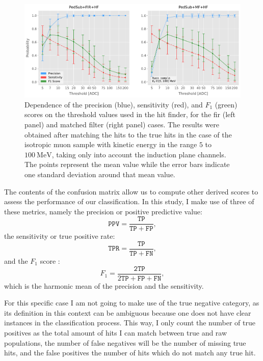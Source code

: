 \begin{figure}[t]
	\centering
	\includegraphics[width=.99\linewidth]{Images/Matched_Filter/hit_study_muon_scores_indct}
	\caption[Dependence of the precision, sensitivity, and $F_{1}$ scores on the threshold values used in the hit finder for the \gls{fir} and matched filters.]{Dependence of the precision (blue), sensitivity (red), and $F_{1}$ (green) scores on the threshold values used in the hit finder, for the \gls{fir} (left panel) and matched filter (right panel) cases. The results were obtained after matching the hits to the true hits in the case of the isotropic muon sample with kinetic energy in the range $5$ to $100 \ \mathrm{MeV}$, taking only into account the induction plane channels. The points represent the mean value while the error bars indicate one standard deviation around that mean value.}
	\label{fig:threshold_opt}
\end{figure}

The contents of the confusion matrix allow us to compute other derived scores to assess the performance of our classification. In this study, I make use of three of these metrics, namely the precision or positive predictive value:
\begin{equation}
	\mathtt{PPV} = \frac{\mathtt{TP}}{\mathtt{TP} + \mathtt{FP}},
\end{equation}
the sensitivity or true positive rate:
\begin{equation}
	\mathtt{TPR} = \frac{\mathtt{TP}}{\mathtt{TP} + \mathtt{FN}},
\end{equation}
and the $F_{1}$ score \cite{Taha2015}:
\begin{equation}
	F_{1} = \frac{\mathtt{2 TP}}{2\mathtt{TP} + \mathtt{FP} + \mathtt{FN}},
\end{equation}
which is the harmonic mean of the precision and the sensitivity.

For this specific case I am not going to make use of the true negative category, as its definition in this context can be ambiguous because one does not have clear instances in the classification process. This way, I only count the number of true positives as the total amount of hits I can match between true and raw populations, the number of false negatives will be the number of missing true hits, and the false positives the number of hits which do not match any true hit.

